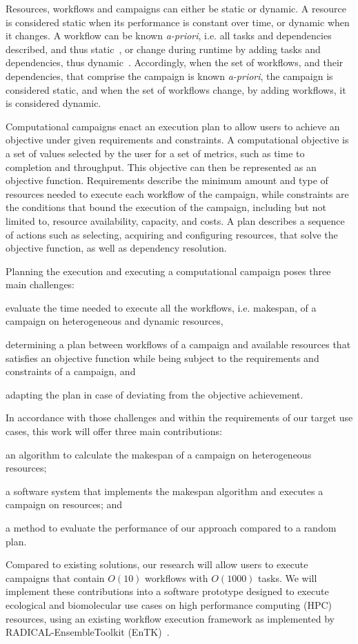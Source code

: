 Resources, workflows and campaigns can either be static or dynamic. A resource is considered static when its performance is constant over time, or dynamic when it changes. A workflow can be known \textit{a-priori}, i.e. all tasks and dependencies described, and thus static~\cite{paraskevakos2019workflow}, or change during runtime by adding tasks and dependencies, thus dynamic~\cite{dakka2018high}. Accordingly, when the set of workflows, and their dependencies, that comprise the campaign is known \textit{a-priori}, the campaign is considered static, and when the set of workflows change, by adding workflows, it is considered dynamic.

Computational campaigns enact an execution plan to allow users to achieve an objective under given requirements and constraints. A computational objective is a set of values selected by the user for a set of metrics, such as time to completion and throughput. This objective can then be represented as an objective function. Requirements describe the minimum amount and type of resources needed to execute each workflow of the campaign, while constraints are the conditions that bound the execution of the campaign, including but not limited to, resource availability, capacity, and costs. A plan describes a sequence of actions such as selecting, acquiring and configuring resources, that solve the objective function, as well as dependency resolution.

Planning the execution and executing a computational campaign poses three main challenges: 
\begin{inparaenum}[(i)]
\item evaluate the time needed to execute all the workflows, i.e. makespan, of a campaign on heterogeneous and dynamic resources,
\item determining a plan between workflows of a campaign and available resources that satisfies an objective function while being subject to the requirements and constraints of a campaign, and
\item adapting the plan in case of deviating from the objective achievement.
\end{inparaenum}

In accordance with those challenges and within the requirements of our target use cases, this work will offer three main contributions: 
\begin{inparaenum}[(1)]
\item an algorithm to calculate the makespan of a campaign on heterogeneous resources;
\item a software system that implements the makespan algorithm and executes a campaign on resources; and 
\item a method to evaluate the performance of our approach compared to a random plan. 
\end{inparaenum}
Compared to existing solutions, our research will allow users to execute campaigns that contain $O(10)$ workflows with $O(1000)$ tasks. We will implement these contributions into a software prototype designed to execute ecological and biomolecular use cases on high performance computing (HPC) resources, using an existing workflow execution framework as implemented by RADICAL-EnsembleToolkit (EnTK)~\cite{balasubramanian2018harnessing}.

